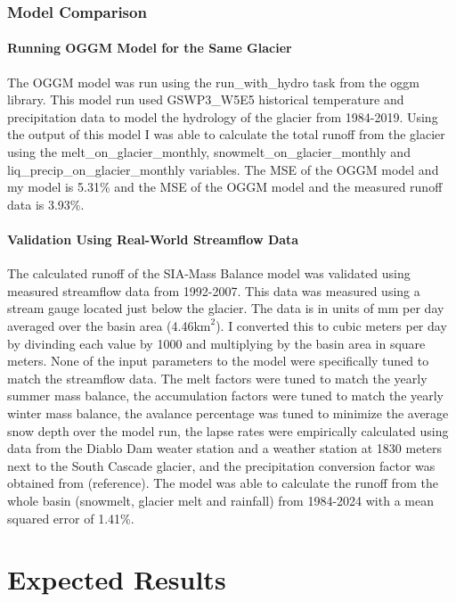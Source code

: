 \documentclass{article}
\begin{document}
\subsubsection{Model Comparison}
\paragraph{Running OGGM Model for the Same Glacier}

The OGGM model was run using the run\_with\_hydro task from the oggm library. This model run used GSWP3\_W5E5 historical temperature and 
precipitation data to model the hydrology of the glacier from 1984-2019. Using the output of this model I was able to calculate the total 
runoff from the glacier using the melt\_on\_glacier\_monthly, snowmelt\_on\_glacier\_monthly and liq\_precip\_on\_glacier\_monthly variables. 
The MSE of the OGGM model and my model is 5.31\% and the MSE of the OGGM model and the measured runoff data is 3.93\%.

\paragraph{Validation Using Real-World Streamflow Data }

The calculated runoff of the SIA-Mass Balance model was validated using measured streamflow data from 1992-2007. This data was measured using 
a stream gauge located just below the glacier. The data is in units of mm per day averaged over the basin area (4.46$\text{km}^2$). I 
converted this to cubic meters per day by divinding each value by 1000 and multiplying by the basin area in square meters. None of the input 
parameters to the model were specifically tuned to match the streamflow data. The melt factors were tuned to match the yearly summer mass 
balance, the accumulation factors were tuned to match the yearly winter mass balance, the avalance percentage was tuned to minimize the 
average snow depth over the model run, the lapse rates were empirically calculated using data from the Diablo Dam weater station and a weather station 
at 1830 meters next to the South Cascade glacier, and the precipitation conversion factor was obtained from (reference). The model was able 
to calculate the runoff from the whole basin (snowmelt, glacier melt and rainfall) from 1984-2024 with a mean squared error of 1.41\%.

\section{Expected Results}
\end{document}
